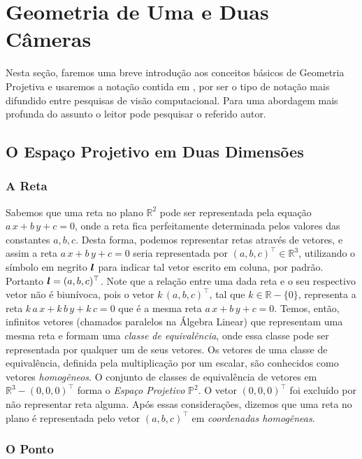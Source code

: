 \section{Geometria de Uma e Duas Câmeras}
Nesta seção, faremos uma breve introdução aos conceitos básicos de Geometria Projetiva e usaremos a notação contida em \cite{Hartley2004}, por ser o tipo de notação mais difundido entre pesquisas de visão computacional. Para uma abordagem mais profunda do assunto o leitor pode pesquisar o referido autor.  

\subsection{O Espaço Projetivo em Duas Dimensões}\label{sec.espaco-P2}


\subsubsection{A Reta}\label{sec.reta}


Sabemos que uma reta no plano $\mathbb{R}^{2}$ pode ser representada pela equação $a\,x+b\,y+c=0$, onde a reta fica perfeitamente determinada pelos valores das constantes $a,b,c$. Desta forma, podemos representar retas através de vetores, e assim a reta $a\,x+b\,y+c=0$ seria representada por $(a,b,c)^\top \in \mathbb{R}^{3}$, utilizando o símbolo em negrito $\boldsymbol{l}$ para indicar tal vetor escrito em coluna, por padrão. Portanto $\boldsymbol{l} = (a,b,c)^\top$. Note que a relação entre uma dada reta e o seu respectivo vetor não é biunívoca, pois o vetor $k\,(a,b,c)^\top$, tal que $k \in \mathbb{R}-\{0\}$, representa a reta $k\,a\,x+k\,b\,y+k\,c=0$ que é a mesma reta $a\,x+b\,y+c=0$. Temos, então, infinitos vetores (chamados paralelos na Álgebra Linear) que representam uma mesma reta e formam uma {\it classe de equivalência}, onde essa classe pode ser representada por qualquer um de seus vetores. Os vetores de uma classe de equivalência, definida pela multiplicação por um escalar, são conhecidos como vetores {\it homogêneos}. O conjunto de classes de equivalência de vetores em $\mathbb{R}^{3} - (0,0,0)^\top$ forma o {\it Espaço Projetivo} $\mathbb{P}^{2}$. O vetor $(0,0,0)^\top$ foi excluído por não representar reta alguma. Após essas considerações, dizemos que uma reta no plano é representada pelo vetor $(a,b,c)^\top$ em {\it coordenadas homogêneas}.\\

\subsubsection{O Ponto}\label{sec.ponto}



